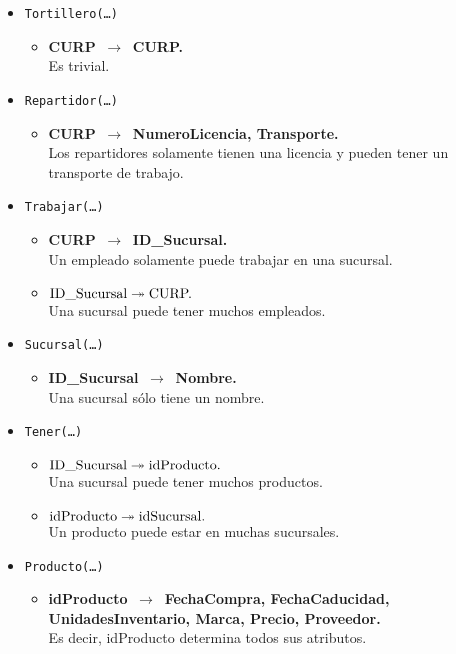 \documentclass{article}
\newcommand{\flecha}{$\,\to\,$ }
\begin{document}
\begin{itemize}
\item \texttt{Tortillero(\ldots)}
	\begin{itemize}
		\item \textbf{CURP \flecha CURP.}\\
		Es trivial.
	\end{itemize}

\item \texttt{Repartidor(\ldots)}
	\begin{itemize}
		\item \textbf{CURP \flecha NumeroLicencia, Transporte.}\\
		Los repartidores solamente tienen una licencia y pueden tener un transporte de trabajo.
	\end{itemize}

\item \texttt{Trabajar(\ldots)}
	\begin{itemize}
		\item \textbf{CURP \flecha ID\_Sucursal.}\\
		Un empleado solamente puede trabajar en una sucursal.
		\item \textbf{$\hbox{ID\_Sucursal} \twoheadrightarrow \hbox{CURP.}$}\\
		Una sucursal puede tener muchos empleados.
	\end{itemize}

\item \texttt{Sucursal(\ldots)}
	\begin{itemize}
		\item \textbf{ID\_Sucursal \flecha Nombre.}\\
		Una sucursal sólo tiene un nombre.
	\end{itemize}

\item \texttt{Tener(\ldots)}
	\begin{itemize}
		\item \textbf{$\hbox{ID\_Sucursal} \twoheadrightarrow \hbox{idProducto.}$}\\
		Una sucursal puede tener muchos productos.
		\item \textbf{$\hbox{idProducto} \twoheadrightarrow \hbox{idSucursal.}$}\\
		Un producto puede estar en muchas sucursales.
	\end{itemize}	

\item \texttt{Producto(\ldots)}
	\begin{itemize}
		\item \textbf{idProducto \flecha FechaCompra, FechaCaducidad, UnidadesInventario, Marca, Precio, Proveedor.}\\
		Es decir, idProducto determina todos sus atributos.\\
	\end{itemize}


\end{itemize}
\end{document}
